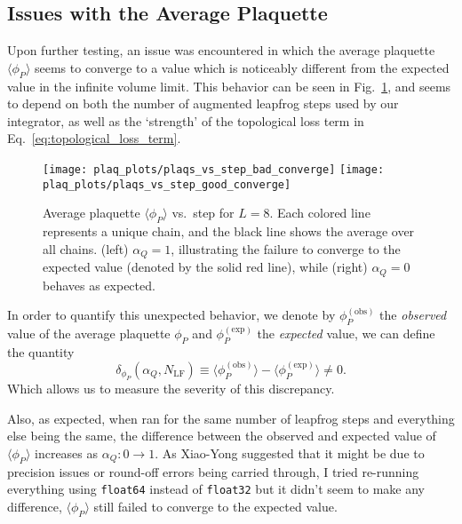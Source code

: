 \documentclass[../main.tex]{subfiles}
\begin{document}
\subsection*{Issues with the Average Plaquette}
%
Upon further testing, an issue was encountered in which the average plaquette $\langle \phi_{P}\rangle$ seems to
converge to a value which is noticeably different from the expected value in the infinite volume limit.
%
This behavior can be seen in Fig.~\ref{fig:bad_convergence}, and seems to depend on both the number of augmented
leapfrog steps used by our integrator, as well as the `strength' of the topological loss term in
Eq.~\ref{eq:topological_loss_term}.
%
\begin{figure}[htpb]\label{fig:bad_convergence}
  \centering
  \texttt{[image: plaq\_plots/plaqs\_vs\_step\_bad\_converge]} 
  \texttt{[image: plaq\_plots/plaqs\_vs\_step\_good\_converge]} 
  \caption{Average plaquette $\langle\phi_{P}\rangle$ vs.\ step for $L=8$. Each
    colored line represents a unique chain, and the black line shows the
    average over all chains.  (left) $\alpha_{Q} = 1$, illustrating the failure
    to converge to the expected value (denoted by the solid red line), while
    (right) $\alpha_{Q} = 0$ behaves as expected.}
\end{figure}
%
In order to quantify this unexpected behavior, we denote by $\phi_{P}^{(\mathrm{obs})}$ the \emph{observed} value of
the average plaquette $\phi_{P}$ and $\phi_{P}^{(\mathrm{exp})}$ the \emph{expected} value, we can define the quantity
%
\begin{equation}
  {\delta_{\phi_P}(\alpha_Q, N_{\mathrm{LF}}) \equiv \langle \phi_P^{\mathrm{(obs)}}\rangle 
  - \langle{\phi_{P}^{\mathrm{(exp)}}}\rangle \neq 0}.
\end{equation}
%
Which allows us to measure the severity of this discrepancy.%
%
%

Also, as expected, when ran for the same number of leapfrog steps and everything else being the same, the difference
between the observed and expected value of $\langle\phi_{P}\rangle$ increases as $\alpha_{Q}: 0 \rightarrow 1$.
%
As Xiao-Yong suggested that it might be due to precision issues or round-off errors being carried through, I tried
re-running everything using \texttt{float64} instead of \texttt{float32} but it didn't seem to make any difference,
$\langle\phi_{P}\rangle$ still failed to converge to the expected value.
\end{document}
